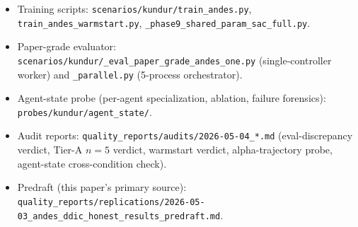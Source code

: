 \documentclass[journal,onecolumn,11pt]{IEEEtran}
\begin{document}
\begin{itemize}
  \item Training scripts:
        \texttt{scenarios/kundur/train\_andes.py},
        \texttt{train\_andes\_warmstart.py},
        \texttt{\_phase9\_shared\_param\_sac\_full.py}.
  \item Paper-grade evaluator:
        \texttt{scenarios/kundur/\_eval\_paper\_grade\_andes\_one.py}
        (single-controller worker) and \texttt{\_parallel.py}
        (5-process orchestrator).
  \item Agent-state probe (per-agent specialization, ablation, failure
        forensics): \texttt{probes/kundur/agent\_state/}.
  \item Audit reports: \texttt{quality\_reports/audits/2026-05-04\_*.md}
        (eval-discrepancy verdict, Tier-A $n = 5$ verdict, warmstart
        verdict, alpha-trajectory probe, agent-state cross-condition
        check).
  \item Predraft (this paper's primary source):
        \texttt{quality\_reports/replications/2026-05-03\_andes\_ddic\_honest\_results\_predraft.md}.
\end{itemize}



\end{document}

